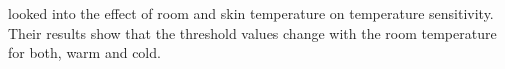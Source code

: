 \cite{hirosawa} looked into the effect of room and skin temperature on temperature sensitivity.
Their results show that the threshold values change with the room temperature for both, warm and cold.







































